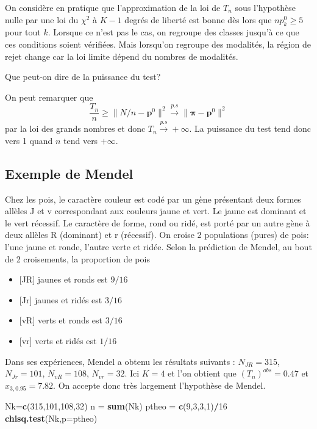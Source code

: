 \documentclass[
]{book}
\newenvironment{Shaded}{\begin{snugshade}}{\end{snugshade}}
\newcommand{\DataTypeTok}[1]{\textcolor[rgb]{0.13,0.29,0.53}{#1}}
\newcommand{\DecValTok}[1]{\textcolor[rgb]{0.00,0.00,0.81}{#1}}
\newcommand{\KeywordTok}[1]{\textcolor[rgb]{0.13,0.29,0.53}{\textbf{#1}}}
\newcommand{\NormalTok}[1]{#1}
\newcommand{\OperatorTok}[1]{\textcolor[rgb]{0.81,0.36,0.00}{\textbf{#1}}}
\newcommand{\StringTok}[1]{\textcolor[rgb]{0.31,0.60,0.02}{#1}}
\providecommand{\tightlist}{%
  \setlength{\itemsep}{0pt}\setlength{\parskip}{0pt}}
\theoremstyle{definition}
\theoremstyle{definition}
\theoremstyle{definition}
\theoremstyle{definition}
\theoremstyle{remark}
\begin{document}
On considère en pratique que l'approximation de la loi de \(T_n\)
sous l'hypothèse nulle par une loi du \(\chi^2\) à \(K-1\) degrés de liberté est bonne
dès lors que \(n p^0_k\geq 5\) pour tout \(k\). Lorsque ce n'est pas le cas, on regroupe des classes jusqu'à ce que ces conditions
soient vérifiées. Mais lorsqu'on regroupe des modalités, la région de rejet change car la loi limite dépend du nombres de modalités.

Que peut-on dire de la puissance du test?

On peut remarquer que
\[
\frac{T_n}{n}\geq \| N/n -  \mathbf{p}^0\|^2 \stackrel{p.s}{\longrightarrow} \|\boldsymbol{\pi} -  \mathbf{p}^0\|^2
\]
par la loi des grands nombres et donc \(T_n \stackrel{p.s}{\longrightarrow} +\infty\). La puissance du test
tend donc vers 1 quand \(n\) tend vers \(+\infty\).

\hypertarget{exemple-de-mendel}{%
\subsection{Exemple de Mendel}\label{exemple-de-mendel}}

Chez les pois, le caractère couleur est codé par un gène présentant deux formes allèles J et v correspondant aux couleurs jaune et vert. Le jaune est dominant et le vert récessif. Le caractère de forme, rond ou ridé, est porté par un autre gène à deux allèles R (dominant) et r (récessif). On croise 2 populations (pures) de pois: l'une jaune et ronde, l'autre verte et
ridée. Selon la prédiction de Mendel, au bout de 2 croisements, la proportion de pois

\begin{itemize}
\tightlist
\item
  {[}JR{]} jaunes et ronds est \(9/16\)
\item
  {[}Jr{]} jaunes et ridés est \(3/16\)
\item
  {[}vR{]} verts et ronds est \(3/16\)
\item
  {[}vr{]} verts et ridés est \(1/16\)
\end{itemize}

Dans ses expériences, Mendel a obtenu les résultats suivants :
\(N_{JR}=315\), \(N_{Jr}=101\), \(N_{vR}=108\), \(N_{vr}=32\). Ici \(K=4\) et l'on
obtient que \((T_n)^{obs}=0.47\) et \(x_{3,0.95}=7.82\). On accepte
donc très largement l'hypothèse de Mendel.

\begin{Shaded}
\begin{Highlighting}[]
\NormalTok{Nk=}\KeywordTok{c}\NormalTok{(}\DecValTok{315}\NormalTok{,}\DecValTok{101}\NormalTok{,}\DecValTok{108}\NormalTok{,}\DecValTok{32}\NormalTok{)}
\NormalTok{n =}\StringTok{ }\KeywordTok{sum}\NormalTok{(Nk)}
\NormalTok{ptheo =}\StringTok{ }\KeywordTok{c}\NormalTok{(}\DecValTok{9}\NormalTok{,}\DecValTok{3}\NormalTok{,}\DecValTok{3}\NormalTok{,}\DecValTok{1}\NormalTok{)}\OperatorTok{/}\DecValTok{16}
\KeywordTok{chisq.test}\NormalTok{(Nk,}\DataTypeTok{p=}\NormalTok{ptheo) }
\end{Highlighting}
\end{Shaded}
\end{document}
